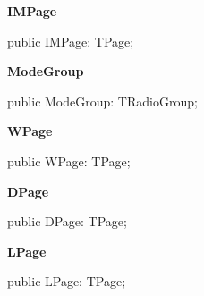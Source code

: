 \documentclass{report}
\newif\ifpdf
\begin{document}
\begin{list}{}
\begin{flushleft}
\ifpdf
\end{flushleft}
\fi


\par  \label{mainunit.TIWizFrm-IMPage}
\item[\textbf{IMPage}\hfill]
\ifpdf
\begin{flushleft}
\fi
\begin{ttfamily}
public IMPage: TPage;\end{ttfamily}

\ifpdf
\end{flushleft}
\fi


\par  \label{mainunit.TIWizFrm-ModeGroup}
\item[\textbf{ModeGroup}\hfill]
\ifpdf
\begin{flushleft}
\fi
\begin{ttfamily}
public ModeGroup: TRadioGroup;\end{ttfamily}

\ifpdf
\end{flushleft}
\fi


\par  \label{mainunit.TIWizFrm-WPage}
\item[\textbf{WPage}\hfill]
\ifpdf
\begin{flushleft}
\fi
\begin{ttfamily}
public WPage: TPage;\end{ttfamily}

\ifpdf
\end{flushleft}
\fi


\par  \label{mainunit.TIWizFrm-DPage}
\item[\textbf{DPage}\hfill]
\ifpdf
\begin{flushleft}
\fi
\begin{ttfamily}
public DPage: TPage;\end{ttfamily}

\ifpdf
\end{flushleft}
\fi


\par  \label{mainunit.TIWizFrm-LPage}
\item[\textbf{LPage}\hfill]
\ifpdf
\begin{flushleft}
\fi
\begin{ttfamily}
public LPage: TPage;\end{ttfamily}

\ifpdf
\end{flushleft}
\fi



\end{list}
\end{document}
